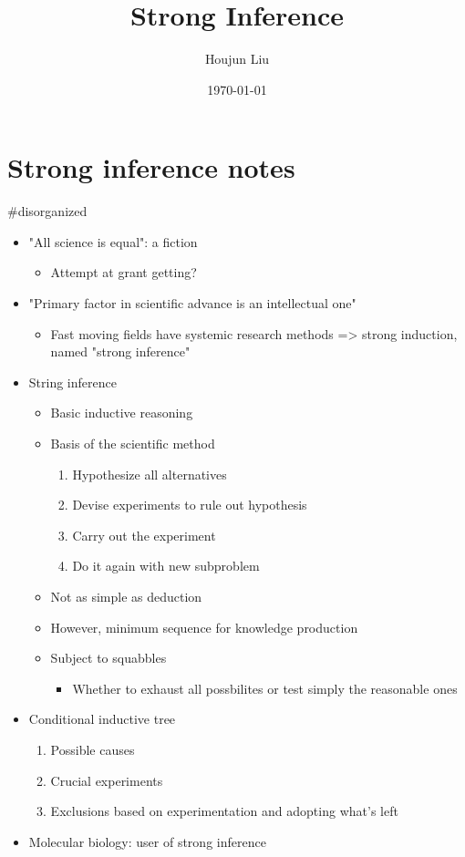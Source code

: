 \documentclass[letterpaper]{article}
\author{Houjun Liu}
\date{\today}
\title{Strong Inference}
\renewcommand{\tableofcontents}{}
\begin{document}
\tableofcontents



\section{Strong inference notes}
\label{sec:org2d840b9}
\#disorganized

\begin{itemize}
\item "All science is equal": a fiction

\begin{itemize}
\item Attempt at grant getting?
\end{itemize}

\item "Primary factor in scientific advance is an intellectual one"

\begin{itemize}
\item Fast moving fields have systemic research methods => strong
induction, named "strong inference"
\end{itemize}

\item String inference

\begin{itemize}
\item Basic inductive reasoning
\item Basis of the scientific method

\begin{enumerate}
\item Hypothesize all alternatives
\item Devise experiments to rule out hypothesis
\item Carry out the experiment
\item Do it again with new subproblem
\end{enumerate}

\item Not as simple as deduction
\item However, minimum sequence for knowledge production
\item Subject to squabbles

\begin{itemize}
\item Whether to exhaust all possbilites or test simply the reasonable
ones
\end{itemize}
\end{itemize}

\item Conditional inductive tree

\begin{enumerate}
\item Possible causes
\item Crucial experiments
\item Exclusions based on experimentation and adopting what's left
\end{enumerate}

\item Molecular biology: user of strong inference
\end{itemize}
\end{document}
